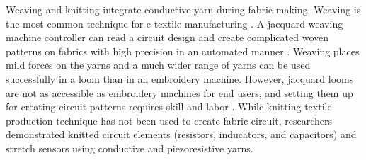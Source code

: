 Weaving \cite{bonderover2004woven,dhawan2004woven1, dhawan2004woven2} and knitting \cite{farringdon1999wearable} integrate conductive yarn during fabric making.  Weaving is the most common technique for e-textile manufacturing \cite{nakad2007using}. 
A jacquard weaving machine controller can read a circuit design and create complicated woven patterns on fabrics with high precision in an automated manner \cite{poupyrev2016project}. Weaving places mild forces on the yarns and a much wider range of yarns can be used successfully in a loom than in an embroidery machine.
However, jacquard looms are not as accessible as embroidery machines for end users, and setting them up for creating circuit patterns requires skill and labor \cite{linz2008embroidered}. While knitting textile production technique has not been used to create fabric circuit, researchers demonstrated knitted circuit elements (resistors, inducators, and capacitors) \cite{wijesiriwardana2004fibre} and stretch sensors \cite{paradiso2005wearable} using conductive and piezoresistive yarns. 


